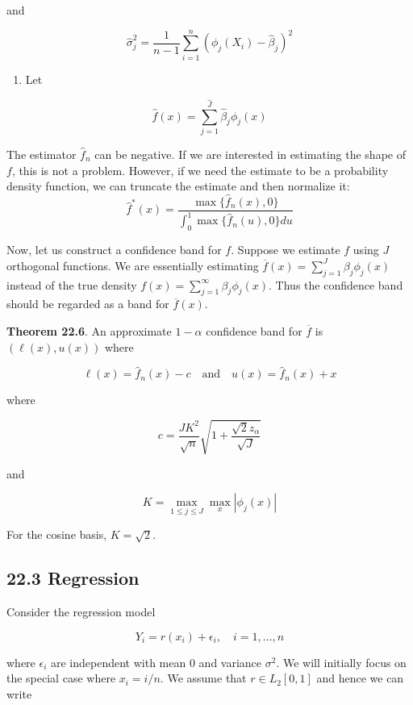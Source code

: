 and

\[ \hat{\sigma}_{j}^{2} = \frac{1}{n - 1} \sum_{i=1}^{n} \left( \phi_{j}(X_{i}) - \hat{\beta}_{j}\right)^{2} \]

\begin{enumerate}[tightlist,label={\arabic*.},resume]
\item
  Let
\end{enumerate}

\[ \hat{f}(x) = \sum_{j=1}^\hat{J} \hat{\beta}_{j} \phi_{j}(x) \]

The estimator \(\hat{f}_{n}\) can be negative. If we are interested in
estimating the shape of \(f\), this is not a problem. However, if we
need the estimate to be a probability density function, we can truncate
the estimate and then normalize it:\\
\[\hat{f}^*(x) = \frac{\max \{ \hat{f}_{n}(x), 0 \}}{\int_{0}^{1} \max \{ \hat{f}_{n}(u), 0 \} du}\]

Now, let us construct a confidence band for \(f\). Suppose we estimate
\(f\) using \(J\) orthogonal functions. We are essentially estimating
\(\overline{f}(x) = \sum_{j=1}^J \beta_{j} \phi_{j}(x)\) instead of the true
density \(f(x) = \sum_{j=1}^{\infty} \beta_{j} \phi_{j}(x)\). Thus the
confidence band should be regarded as a band for \(\overline{f}(x)\).

\textbf{Theorem 22.6}. An approximate \(1 - \alpha\) confidence band for
\(\overline{f}\) is \((\ell(x), u(x))\) where

\[
\ell(x) = \hat{f}_{n}(x) - c
\quad \text{and} \quad
u(x) = \hat{f}_{n}(x) + x
\]

where

\[ c = \frac{JK^{2}}{\sqrt{n}} \sqrt{1 + \frac{\sqrt{2} z_{\alpha}}{\sqrt{J}}} \]

and

\[ K = \max_{1 \leq j \leq J} \max_x | \phi_{j}(x) | \]

For the cosine basis, \(K = \sqrt{2}\).

\subsection*{22.3 Regression}\label{regression}

Consider the regression model

\[ Y_{i} = r(x_{i}) + \epsilon_{i}, \quad i = 1, \dots, n\]

where \(\epsilon_{i}\) are independent with mean 0 and variance
\(\sigma^{2}\). We will initially focus on the special case where
\(x_{i} = i / n\). We assume that \(r \in L_{2}[0, 1]\) and hence we can
write

